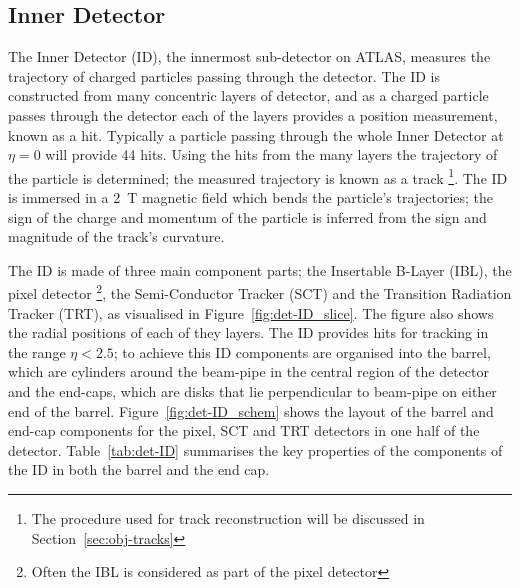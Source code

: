 
\subsection{Inner Detector}
\label{sec:det-ID}

The Inner Detector (ID), the innermost sub-detector on ATLAS,
measures the trajectory of charged particles passing through the detector.
The ID is constructed from many concentric layers of detector,
and as a charged particle passes through the detector each of the layers provides a position measurement, known as a hit.
Typically a particle passing through the whole Inner Detector at $\eta=0$ will provide 44 hits. %
Using the hits from the many layers the trajectory of the particle is determined;
the measured trajectory is known as a track \footnote{ The procedure used for track reconstruction will be discussed in Section~\ref{sec:obj-tracks}}.
The ID is immersed in a 2~T magnetic field which bends the particle's trajectories;
the sign of the charge and momentum of the particle is inferred from the sign and magnitude of the track's curvature.

The ID is made of three main component parts; the Insertable B-Layer (IBL), the pixel detector \footnote{ Often the IBL is considered as part of the pixel detector},
the Semi-Conductor Tracker (SCT) and the Transition Radiation Tracker (TRT), as visualised in Figure~\ref{fig:det-ID_slice}.
The figure also shows the radial positions of each of they layers.
The ID provides hits for tracking in the range $\eta < 2.5$;
to achieve this ID components are organised into the barrel, which are cylinders around the beam-pipe in the central region %
of the detector and the end-caps, which are disks that lie perpendicular to beam-pipe on either end of the barrel.
Figure~\ref{fig:det-ID_schem} shows the layout of the barrel and end-cap components for the pixel, SCT and TRT detectors in one half of the detector.
Table~\ref{tab:det-ID} summarises the key properties of the components of the ID in both the barrel and the end cap.

